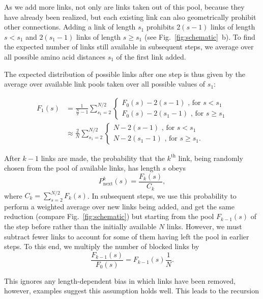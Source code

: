 \documentclass[
reprint,
twocolumn,
amsmath,amssymb,superscriptaddress,aps,
pre]{revtex4-1}
\newcommand{\Pin}{P_{\mathrm{next}}}
\begin{document}
As we add more links, not only are links taken out of this pool, because they have already been realized, but each existing link can also geometrically prohibit other connections. Adding a link of length $s_1$ prohibits $2(s-1)$ links of length $s<s_1$ and $2(s_1-1)$ links of length $s\geq s_1$ (see Fig.~\ref{fig:schematic}~b). To find the expected number of links still available in subsequent steps, we average over all possible amino acid distances $s_1$ of the first link added.

The expected distribution of possible links after one step is thus given by the average over available link pools taken over all possible values of $s_1$:


\begin{align}
    F_1(s)&=\frac{1}{\frac{N}{2}-1} \sum_{s_1=2}^{N/2}{ \begin{cases}
    F_0(s)-2(s-1) \text{ , for } s<s_1\\
    F_0(s)-2(s_1 -1)\text{ , for } s\geq s_1
    \end{cases}}\nonumber\\
    &\approx\frac{2}{N} \sum_{s_1=2}^{N/2} { \begin{cases}
    N-2(s-1) \text{ , for } s<s_1\\
    N-2(s_1 -1)\text{ , for } s\geq s_1.
    \end{cases}}
\label{eq:reduction_first_step}
\end{align}



After $k-1$ links are made, the probability that the $k^{\mathrm{th}}$ link, being randomly chosen from the pool of available links, has length $s$ obeys
\begin{equation}
    \Pin^k(s)=\frac{F_k(s)}{C_k},
\end{equation}
where $C_k=\sum_{s=2}^{N/2}F_k(s)$. In subsequent steps, we use this probability to perform a weighted average over new links being added, and get the same reduction (compare Fig.~\ref{fig:schematic}) but starting from the pool $F_{k-1}(s)$ of the step before rather than the initially available $N$ links. However, we must subtract fewer links to account for some of them having left the pool in earlier steps. To this end, we multiply the number of blocked links by
\begin{equation}
    \frac{F_{k-1}(s)}{F_0(s)} = F_{k-1}(s)\frac{1}{N}.
    \label{eq.Pk}
\end{equation}

This ignores any length-dependent bias in which links have been removed, however, examples suggest this assumption holds well. 
This leads to the recursion
\end{document}
